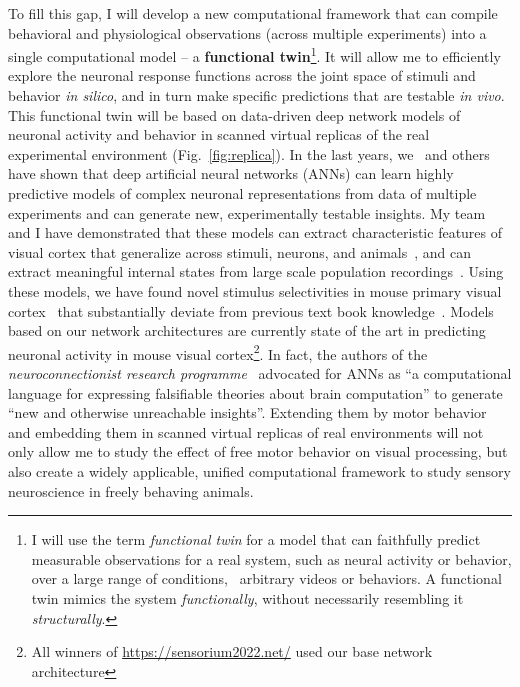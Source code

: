 \documentclass[COG,11pt]{ercgrant}
\begin{document}
To fill this gap, I will develop a new computational framework that can compile behavioral and physiological observations (across multiple experiments) into a single computational model -- a \textbf{functional twin}\footnote{I will use the term \textit{functional twin} for a model that can faithfully predict measurable observations for a real system, such as neural activity or behavior, over a large range of conditions, \eg~arbitrary videos or behaviors. A functional twin mimics the system \textit{functionally}, without necessarily resembling it \textit{structurally}.}. It will allow me to efficiently explore the neuronal response functions across the joint space of stimuli and behavior \textit{in silico}, and in turn make specific predictions that are testable \textit{in vivo}.
This functional twin will be based on data-driven deep network models of neuronal activity and behavior in scanned virtual replicas of the real experimental environment (Fig.~\ref{fig:replica}).
In the last years, we~\parencite{Walker2019-yw, Cobos2022-rr, Franke2022-do} and others~\parencite{Bashivan2019-ry, Ponce2019-yn, Hofling2022-wr} have shown that deep artificial neural networks (ANNs) can learn highly predictive models of complex neuronal representations from data of multiple experiments and can generate new, experimentally testable insights.
My team and I have demonstrated that these models can extract characteristic features of visual cortex that generalize across stimuli, neurons, and animals~\parencite{Sinz2018-sk,Lurz2020-ua,Cobos2022-rr}, and can extract meaningful internal states from large scale population recordings~\parencite{Bashiri2021-or}. 
Using these models, we have found novel stimulus selectivities in  mouse primary visual cortex~\parencite{Walker2019-yw,Franke2022-do} that substantially deviate from previous text book knowledge~\parencite{Hubel1959-zs}.
Models based on our network architectures are currently state of the art in predicting neuronal activity in mouse visual cortex\footnote{All winners of  \url{https://sensorium2022.net/} used our base network architecture}. 
In fact, the authors of the \textit{neuroconnectionist research programme}~\parencite{Doerig2022-ex} advocated for ANNs as ``a computational language for expressing falsifiable theories about brain computation'' to generate ``new and otherwise unreachable insights''. 
Extending them by motor behavior and embedding them in scanned virtual replicas of real environments will not only allow me to study the effect of free motor behavior on visual processing, but also create a widely applicable, unified computational framework to study sensory neuroscience in freely behaving animals. 
\end{document}

